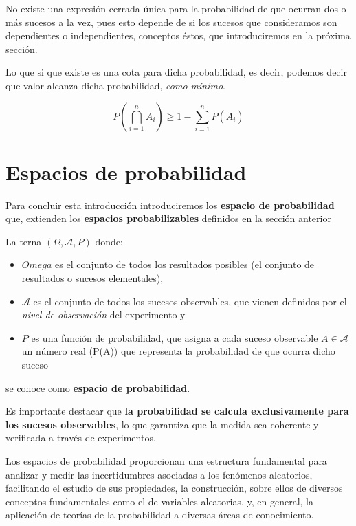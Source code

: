 \documentclass[
  a4paper,
  DIV=11,
  numbers=noendperiod]{scrreprt}
\providecommand{\tightlist}{%
  \setlength{\itemsep}{0pt}\setlength{\parskip}{0pt}}\usepackage{longtable,booktabs,array}
\begin{document}
No existe una expresión cerrada única para la probabilidad de que
ocurran dos o más sucesos a la vez, pues esto depende de si los sucesos
que consideramos son dependientes o independientes, conceptos éstos, que
introduciremos en la próxima sección.

Lo que si que existe es una cota para dicha probabilidad, es decir,
podemos decir que valor alcanza dicha probabilidad, \emph{como mínimo}.

\[
P\left(\bigcap_{i=1}^{n} A_{i}\right) \geq 1-\sum_{i=1}^{n} P\left(\bar{A}_{i}\right)
\]

\section{Espacios de probabilidad}\label{espacios-de-probabilidad}

Para concluir esta introducción introduciremos los \textbf{espacio de
probabilidad} que, extienden los \textbf{espacios probabilizables}
definidos en la sección anterior

La terna \((\Omega, \mathcal{A}, P)\) donde:

\begin{itemize}
\tightlist
\item
  \(Omega\) es el conjunto de todos los resultados posibles (el conjunto
  de resultados o sucesos elementales),
\item
  \(\mathcal{A}\) es el conjunto de todos los sucesos observables, que
  vienen definidos por el \emph{nivel de observación} del experimento y
\item
  \(P\) es una función de probabilidad, que asigna a cada suceso
  observable \(A \in \mathcal{A}\) un número real (P(A)) que representa
  la probabilidad de que ocurra dicho suceso
\end{itemize}

se conoce como \textbf{espacio de probabilidad}.

Es importante destacar que \textbf{la probabilidad se calcula
exclusivamente para los sucesos observables}, lo que garantiza que la
medida sea coherente y verificada a través de experimentos.

Los espacios de probabilidad proporcionan una estructura fundamental
para analizar y medir las incertidumbres asociadas a los fenómenos
aleatorios, facilitando el estudio de sus propiedades, la construcción,
sobre ellos de diversos conceptos fundamentales como el de variables
aleatorias, y, en general, la aplicación de teorías de la probabilidad a
diversas áreas de conocimiento.
\end{document}
